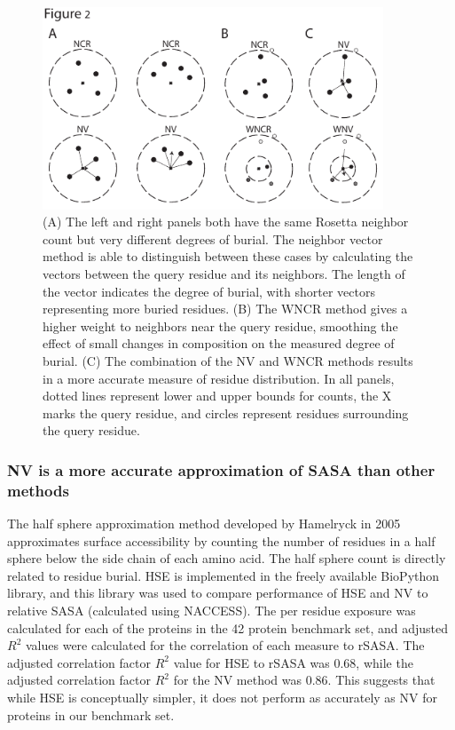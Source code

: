 \begin{figure}
\centering
\includegraphics[width=4in]{figures/nv_kbp/nv_schematic}
\caption{
(A) The left and right panels both have the same Rosetta neighbor count \citep{Dantas:2003vt} but very different degrees of burial.
The neighbor vector method is able to distinguish between these cases by calculating the vectors between the query residue and its neighbors.
The length of the vector indicates the degree of burial, with shorter vectors representing more buried residues. 
(B) The \acs{WNCR} method gives a higher weight to neighbors near the query residue, smoothing the effect of small changes in composition on the measured degree of burial. 
(C) The combination of the \acs{NV} and \acs{WNCR} methods results in a more accurate measure of residue distribution. 
In all panels, dotted lines represent lower and upper bounds for counts, the X marks the query residue, and circles represent residues surrounding the query residue.
}
\label{fig:nv_schematic}
\end{figure}

\subsubsection{\acs{NV} is a more accurate approximation of \acs{SASA} than other methods} 
The half sphere approximation method developed by Hamelryck in 2005 \citep{Hamelryck:2005kt} approximates surface accessibility by counting the number of residues in a half sphere below the side chain of each amino acid.
The half sphere count is directly related to residue burial.
\ac{HSE} is implemented in the freely available BioPython library, and this library was used to compare performance of \ac{HSE} and \ac{NV} to relative \ac{SASA} (calculated using NACCESS).
The per residue exposure was calculated for each of the proteins in the 42 protein benchmark set, and adjusted $R^{2}$ values were calculated for the correlation of each measure to \ac{rSASA}.
The adjusted correlation factor $R^{2}$ value for \ac{HSE} to \ac{rSASA} was 0.68, while the adjusted correlation factor $R^{2}$ for the \ac{NV} method was 0.86.
This suggests that while \ac{HSE} is conceptually simpler, it does not perform as accurately as \ac{NV} for proteins in our benchmark set.

